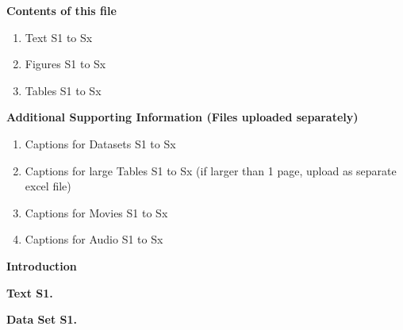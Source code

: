 \documentclass[draft,jgrga]{agutexSI2019}
\begin{document}
\begin{article}

%
%



\noindent\textbf{Contents of this file}
\begin{enumerate}
\item Text S1 to Sx
\item Figures S1 to Sx
\item Tables S1 to Sx
\end{enumerate}
\noindent\textbf{Additional Supporting Information (Files uploaded separately)}
\begin{enumerate}
\item Captions for Datasets S1 to Sx
\item Captions for large Tables S1 to Sx (if larger than 1 page, upload as separate excel file)
\item Captions for Movies S1 to Sx
\item Captions for Audio S1 to Sx
\end{enumerate}

\noindent\textbf{Introduction}


\noindent\textbf{Text S1.}
%


\noindent\textbf{Data Set S1.} %


\end{article}
\end{document}
